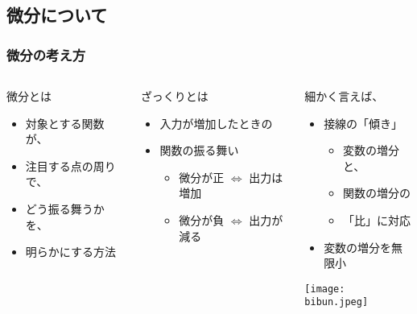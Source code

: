 \documentclass[12pt, dvipdfmx]{beamer}
\begin{document}
\subsection{微分について}
\begin{frame}
	\frametitle{微分の考え方}
		\begin{columns}[T, onlytextwidth]
				\begin{block}{微分とは}
					\begin{itemize}
						\item 対象とする関数が、
						\item \alert{注目する点の周り}で、
						\item どう振る舞うかを、
						\item 明らかにする方法
					\end{itemize}
				\end{block}
				\begin{alertblock}{ざっくりとは}
					\begin{itemize}
						\item 入力が増加したときの
						\item 関数の振る舞い
						\begin{itemize}
							\item 微分が正 $\Leftrightarrow$ 出力は増加
							\item 微分が負 $\Leftrightarrow$ 出力が減る
						\end{itemize}
					\end{itemize}
				\end{alertblock}
				\begin{exampleblock}{細かく言えば、}
					\begin{itemize}
						\item 接線の「傾き」
						\begin{itemize}
							\item 変数の増分と、
							\item 関数の増分の
							\item \alert{「比」}に対応
						\end{itemize}
						\item \alert{変数の増分を無限小}
					\end{itemize}
					\texttt{[image: bibun.jpeg]}
				\end{exampleblock}
		\end{columns}
\end{frame}
\end{document}
